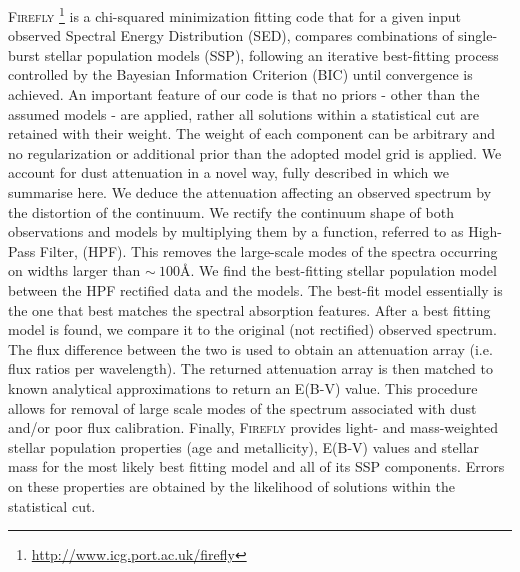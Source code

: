 \documentclass[onecolumn]{aa}
\begin{document}
\textsc{Firefly}
\footnote{\url{http://www.icg.port.ac.uk/firefly}} 
is a chi-squared minimization fitting code that for a given input observed Spectral Energy Distribution (SED), 
compares combinations of single-burst stellar population models (SSP), 
following an iterative best-fitting process controlled by the Bayesian 
Information Criterion (BIC) until convergence is achieved. 
An important feature of our code is that no priors - other than the assumed models - are applied, rather all solutions within a statistical cut are retained with their weight.
The weight of each component can be arbitrary and no regularization or additional prior than the adopted model grid is applied. 
We account for dust attenuation in a novel way, fully described in \citet{firefly2017MNRAS} which we summarise here. 
We deduce the attenuation affecting an observed spectrum by the distortion of the continuum. 
We rectify the continuum shape %
of both observations and models by multiplying them by a function, referred to as High-Pass Filter, (HPF). 
This removes the large-scale modes of the spectra occurring on widths larger than $\sim~100$\AA. 
We find the best-fitting stellar population model between the HPF rectified data and the models. 
The best-fit model essentially is the one that best matches the spectral absorption features. 
After a best fitting model is found, we compare it to the original (not rectified) observed spectrum. 
The flux difference between the two is used to obtain an attenuation array (i.e. flux ratios per wavelength). 
The returned attenuation array is then matched to known analytical approximations to return an E(B-V) value. 
This procedure allows for removal of large scale modes of the spectrum associated with dust and/or poor flux calibration.	
Finally, \textsc{Firefly} provides light- and mass-weighted stellar population properties (age and metallicity), E(B-V) values and stellar mass for the most likely best fitting model and all of its SSP components.  
Errors on these properties are obtained by the likelihood of solutions within the statistical cut. 
\end{document}

